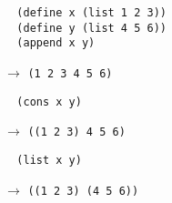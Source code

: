 \documentclass[a4paper,12pt]{article}
\begin{document}
\begin{lstlisting}
  (define x (list 1 2 3))
  (define y (list 4 5 6))
  (append x y)
\end{lstlisting}
$\rightarrow$ \lstinline!(1 2 3 4 5 6)!
\begin{lstlisting}
  (cons x y)
\end{lstlisting}
$\rightarrow$ \lstinline!((1 2 3) 4 5 6)!
\begin{lstlisting}
  (list x y)
\end{lstlisting}
$\rightarrow$ \lstinline!((1 2 3) (4 5 6))!
\end{document}
